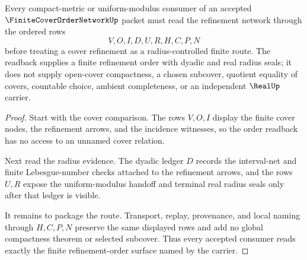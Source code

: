 \begin{theorem}
\label{thm:finite-cover-order-network-order-readback}
Every compact-metric or uniform-modulus consumer of an accepted $\FiniteCoverOrderNetworkUp$ packet must read the refinement network through the ordered rows
$$
V,O,I,D,U,R,H,C,P,N
$$
before treating a cover refinement as a radius-controlled finite route. The readback supplies a finite refinement order with dyadic and real radius seals; it does not supply open-cover compactness, a chosen subcover, quotient equality of covers, countable choice, ambient completeness, or an independent $\RealUp$ carrier.
\end{theorem}
\begin{proof}
Start with the cover comparison. The rows $V,O,I$ display the finite cover nodes, the refinement arrows, and the incidence witnesses, so the order readback has no access to an unnamed cover relation.

Next read the radius evidence. The dyadic ledger $D$ records the interval-net and finite Lebesgue-number checks attached to the refinement arrows, and the rows $U,R$ expose the uniform-modulus handoff and terminal real radius seals only after that ledger is visible.

It remains to package the route. Transport, replay, provenance, and local naming through $H,C,P,N$ preserve the same displayed rows and add no global compactness theorem or selected subcover. Thus every accepted consumer reads exactly the finite refinement-order surface named by the carrier.
\end{proof}


\begin{closurestatus}{\FiniteCoverOrderNetworkUp}
  \theoryclosure{\seedClosure}
  \formalstatus{\unformalizedV}
\end{closurestatus}
